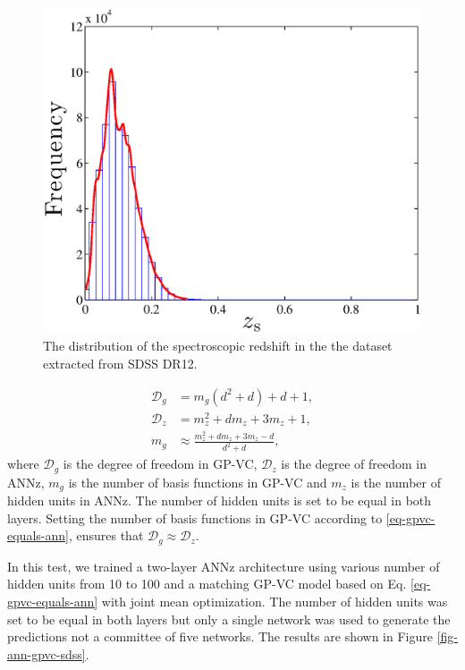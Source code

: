 \documentclass[useAMS,usenatbib,fleqn]{mn2e}
\begin{document}
\begin{figure}
	\centering
	\includegraphics[width=\columnwidth]{figures/zspec_sdss.eps}
	\caption{The distribution of the spectroscopic redshift in the the dataset extracted from SDSS DR12.}
	\label{fig-zpec-sdss}
\end{figure}

\begin{subequations}
\begin{align}
\label{eq-gpvc-degree}
\mathcal{D}_{g}		&=		m_{g}\left(d^{2}+d\right)+d+1,\\
\label{eq-ann-degree}
\mathcal{D}_{z}	&=		m_{z}^{2}+dm_{z}+3m_{z}+1,\\
\label{eq-gpvc-equals-ann}
m_{g}		&\approx 	\frac{m_{z}^{2}+dm_{z}+3m_{z}-d}{d^{2}+d},
\end{align}
\end{subequations}
where $\mathcal{D}_{g}$ is the degree of freedom in GP-VC, $\mathcal{D}_{z}$ is the degree of freedom in {\sc ANNz}, $m_{g}$ is the number of basis functions in GP-VC and $m_{z}$ is the number of hidden units in {\sc ANNz}. The number of hidden units is set to be equal in both layers. Setting the number of basis functions in GP-VC according to \eqref{eq-gpvc-equals-ann}, ensures that $\mathcal{D}_{g} \approx \mathcal{D}_{z}$.

In this test, we trained a two-layer {\sc ANNz} architecture using various number of hidden units from 10 to 100 and a matching GP-VC model based on Eq. \eqref{eq-gpvc-equals-ann} with joint mean optimization. The number of hidden units was set to be equal in both layers but only a single network was used to generate the predictions not a committee of five networks. The results are shown in Figure \ref{fig-ann-gpvc-sdss}.
\end{document}
